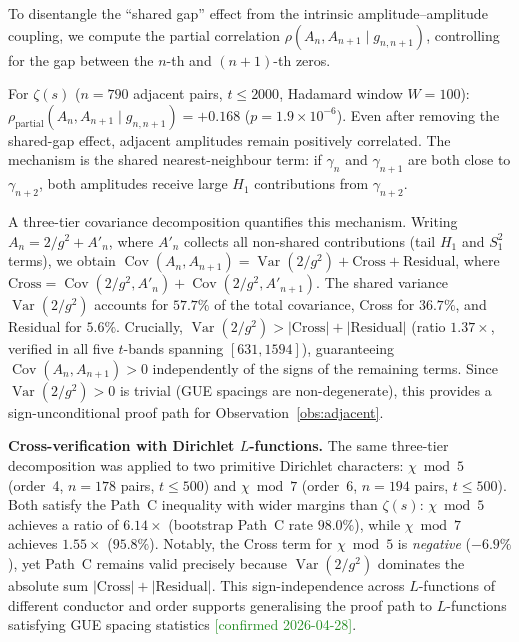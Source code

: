 \documentclass[11pt,a4paper]{article}
\theoremstyle{plain}
\theoremstyle{definition}
\begin{document}
To disentangle the ``shared gap'' effect from the intrinsic
amplitude--amplitude coupling, we compute the partial correlation
$\rho(A_n, A_{n+1} \mid g_{n,n+1})$, controlling for the gap
between the $n$-th and $(n\!+\!1)$-th zeros.

For $\zeta(s)$ ($n = 790$ adjacent pairs, $t \le 2000$, Hadamard window $W\!=\!100$):
$\rho_{\mathrm{partial}}(A_n, A_{n+1} \mid g_{n,n+1}) = +0.168$
($p = 1.9 \times 10^{-6}$).
Even after removing the shared-gap effect, adjacent amplitudes
remain positively correlated.  The mechanism is the shared
nearest-neighbour term: if $\gamma_n$ and $\gamma_{n+1}$ are both
close to $\gamma_{n+2}$, both amplitudes receive large $H_1$
contributions from $\gamma_{n+2}$.

A three-tier covariance decomposition quantifies this mechanism.
Writing $A_n = 2/g^2 + A'_n$, where $A'_n$ collects all non-shared
contributions (tail $H_1$ and $S_1^2$ terms), we obtain
$\operatorname{Cov}(A_n, A_{n+1})
  = \operatorname{Var}(2/g^2) + \text{Cross} + \text{Residual}$,
where $\text{Cross} = \operatorname{Cov}(2/g^2, A'_n)
  + \operatorname{Cov}(2/g^2, A'_{n+1})$.
The shared variance $\operatorname{Var}(2/g^2)$ accounts for $57.7\%$
of the total covariance, Cross for $36.7\%$, and Residual for $5.6\%$.
Crucially,
$\operatorname{Var}(2/g^2) > |\text{Cross}| + |\text{Residual}|$
(ratio $1.37\times$, verified in all five $t$-bands spanning
$[631, 1594]$), guaranteeing $\operatorname{Cov}(A_n, A_{n+1}) > 0$
independently of the signs of the remaining terms.
Since $\operatorname{Var}(2/g^2) > 0$ is trivial (GUE spacings are
non-degenerate), this provides a sign-unconditional proof path
for Observation~\ref{obs:adjacent}.

\textbf{Cross-verification with Dirichlet $L$-functions.}
The same three-tier decomposition was applied to two primitive
Dirichlet characters: $\chi \bmod 5$ (order~4, $n = 178$ pairs,
$t \le 500$) and $\chi \bmod 7$ (order~6, $n = 194$ pairs, $t \le 500$).
Both satisfy the Path~C inequality with wider margins than $\zeta(s)$:
$\chi \bmod 5$ achieves a ratio of $6.14\times$
(bootstrap Path~C rate $98.0\%$), while
$\chi \bmod 7$ achieves $1.55\times$ ($95.8\%$).
Notably, the Cross term for $\chi \bmod 5$ is \emph{negative}
($-6.9\%$), yet Path~C remains valid precisely because
$\operatorname{Var}(2/g^2)$ dominates the absolute sum
$|\text{Cross}| + |\text{Residual}|$.
This sign-independence across $L$-functions of different
conductor and order supports generalising the proof path
to $L$-functions satisfying GUE spacing statistics
\textcolor{ForestGreen}{[confirmed 2026-04-28]}.
\end{document}
